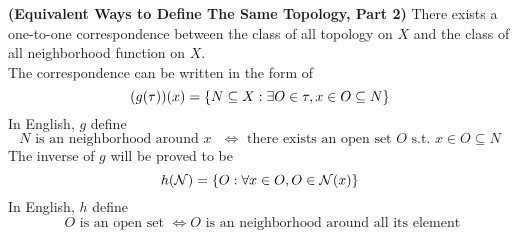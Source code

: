 \documentclass{report}
\begin{document}
\begin{theorem}
\label{2.1.5}
\textbf{(Equivalent Ways to Define The Same Topology, Part 2)} There exists a one-to-one correspondence between the class of all topology on $X$ and the class of all neighborhood function on $X$.\\

The correspondence can be written in the form of 
\begin{equation} (g(\tau))(x)=\{ N\subseteq X: \exists O\in \tau,x\in O\subseteq N \}
\end{equation}
In English, $g$ define
\begin{equation*}
N\text{ is an neighborhood around $x$ }\iff \text{ there exists an open set $O$ s.t. }x\in O\subseteq N
\end{equation*}
The inverse of $g$ will be proved to be
\begin{equation}
   h(\mathcal{N})=\{ O:\forall x \in O, O\in \mathcal{N}(x) \}
\end{equation}
In English, $h$ define
\begin{equation*}
\text{ $O$ is an open set }\iff O \text{ is an neighborhood around all its element }
\end{equation*}
\end{theorem}
\end{document}
